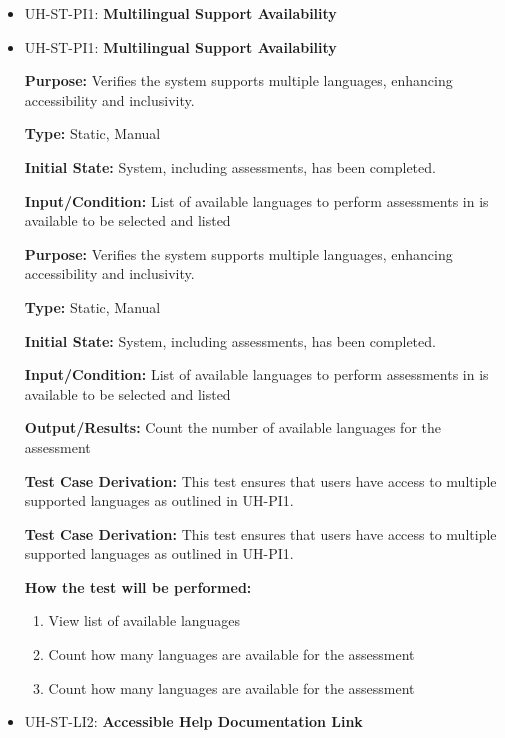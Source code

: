 \documentclass[12pt, titlepage]{article}
\begin{document}
\begin{itemize}
  \item UH-ST-PI1: \textbf{Multilingual Support Availability}

  \item UH-ST-PI1: \textbf{Multilingual Support Availability}
  \begin{mdframed}[linewidth=0.5mm]
      \textbf{Purpose:} Verifies the system supports multiple languages, enhancing accessibility and inclusivity. \par
      \textbf{Type:} Static, Manual \par
      \textbf{Initial State:} System, including assessments, has been completed. \par
      \textbf{Input/Condition:} List of available languages to perform assessments in is available to be selected and listed \par
      \textbf{Purpose:} Verifies the system supports multiple languages, enhancing accessibility and inclusivity. \par
      \textbf{Type:} Static, Manual \par
      \textbf{Initial State:} System, including assessments, has been completed. \par
      \textbf{Input/Condition:} List of available languages to perform assessments in is available to be selected and listed \par
      \textbf{Output/Results:} Count the number of available languages for the assessment \par
      \textbf{Test Case Derivation:} This test ensures that users have access to multiple supported languages as outlined in UH-PI1. \par
      \textbf{Test Case Derivation:} This test ensures that users have access to multiple supported languages as outlined in UH-PI1. \par
      \textbf{How the test will be performed:}
      \begin{enumerate}[noitemsep]
        \item View list of available languages
        \item Count how many languages are available for the assessment
        \item Count how many languages are available for the assessment
      \end{enumerate}
  \end{mdframed}

  \item UH-ST-LI2: \textbf{Accessible Help Documentation Link}


\end{itemize}
\end{document}

